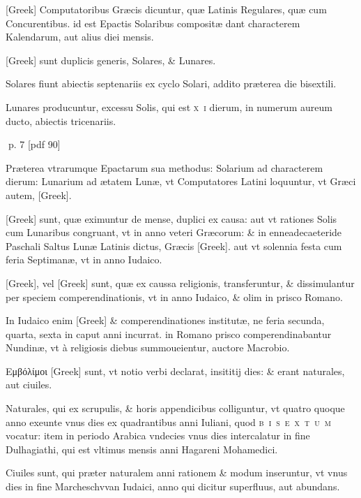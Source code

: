 \begin{parnumbers}
\textgreek{[Greek]} Computatoribus Græcis dicuntur, quæ Latinis Regulares, quæ cum  Concurentibus. id est Epactis Solaribus compositæ dant characterem Kalendarum, aut alius diei mensis.

\textgreek{[Greek]} sunt duplicis generis, Solares, \& Lunares.

Solares fiunt abiectis septenariis ex cyclo Solari, addito præterea die bisextili.

Lunares producuntur, excessu Solis, qui est \textsc{x~i} dierum, in numerum aureum ducto, abiectis tricenariis.

\end{parnumbers}
\clearpage
p. 7 [pdf 90]

\begin{parnumbers}

Præterea vtrarumque Epactarum sua methodus: Solarium ad characterem dierum: Lunarium ad ætatem Lunæ, vt Computatores Latini loquuntur, vt  Græci autem, \textgreek{[Greek]}.

\textgreek{[Greek]} sunt, quæ eximuntur de mense, duplici ex causa: aut vt rationes Solis cum Lunaribus congruant, vt in anno veteri Græcorum: \& in enneadecaeteride Paschali Saltus Lunæ Latinis dictus, Græcis \textgreek{[Greek]}. aut vt solennia festa cum feria Septimanæ, vt in anno Iudaico.

\textgreek{[Greek]}, vel \textgreek{[Greek]} sunt, quæ ex caussa religionis, transferuntur, \& dissimulantur per speciem comperendinationis, vt in anno Iudaico, \& olim in prisco Romano.

In Iudaico enim \textgreek{[Greek]} \& comperendinationes institutæ, ne feria secunda, quarta, sexta in caput anni incurrat. in Romano prisco comperendinabantur Nundinæ, vt à religiosis diebus summoueientur, auctore Macrobio.

\textgreek{Εμβόλίμοι [Greek]} sunt, vt notio verbi declarat, insititij  dies: \& erant naturales, aut ciuiles.

Naturales, qui ex scrupulis, \& horis appendicibus colliguntur, vt quatro quoque anno exeunte vnus dies ex quadrantibus anni Iuliani, quod \textsc{b~i~s~e~x~t~u~m} vocatur: item in periodo Arabica vndecies vnus dies intercalatur in fine Dulhagiathi, qui est vltimus mensis anni Hagareni Mohamedici.

Ciuiles sunt, qui præter naturalem anni rationem \& modum inseruntur, vt vnus dies in fine Marcheschvvan Iudaici, anno qui dicitur superfluus, aut abundans.


\end{parnumbers}
